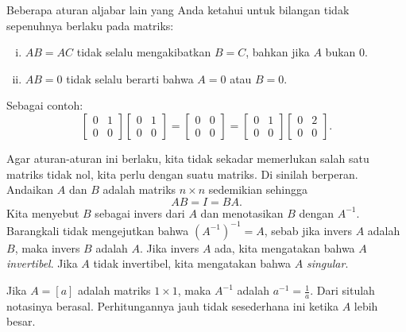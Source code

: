 Beberapa aturan aljabar lain yang Anda ketahui untuk bilangan tidak sepenuhnya
berlaku pada matriks:
\begin{enumerate}[(i)]
\item $AB = AC$ tidak selalu mengakibatkan $B=C$, bahkan jika $A$ bukan 0.
\item $AB = 0$ tidak selalu berarti bahwa $A=0$ atau $B=0$.
\end{enumerate}
Sebagai contoh:
\begin{equation*}
\begin{bmatrix} 0 & 1 \\ 0 & 0 \end{bmatrix}
\begin{bmatrix} 0 & 1 \\ 0 & 0 \end{bmatrix}
=
\begin{bmatrix} 0 & 0 \\ 0 & 0 \end{bmatrix}
=
\begin{bmatrix} 0 & 1 \\ 0 & 0 \end{bmatrix}
\begin{bmatrix} 0 & 2 \\ 0 & 0 \end{bmatrix} .
\end{equation*}

Agar aturan-aturan ini berlaku, kita tidak sekadar memerlukan salah satu matriks tidak nol,
kita perlu  dengan
suatu matriks. Di sinilah \emph{} berperan.
Andaikan $A$ dan $B$ adalah matriks $n \times n$ sedemikian sehingga
\begin{equation*}
AB = I = BA .
\end{equation*}
Kita menyebut $B$ sebagai invers dari $A$ dan menotasikan $B$ dengan $A^{-1}$.
Barangkali tidak mengejutkan bahwa ${(A^{-1})}^{-1} = A$, sebab jika invers $A$
adalah $B$, maka invers $B$ adalah $A$.
Jika invers $A$ ada, kita mengatakan bahwa $A$
\emph{invertibel}.
Jika $A$ tidak invertibel, kita mengatakan bahwa $A$
\emph{singular}.

Jika $A = [a]$ adalah matriks $1 \times 1$, maka $A^{-1}$ adalah $a^{-1} =
\frac{1}{a}$. Dari situlah notasinya berasal. Perhitungannya jauh tidak sesederhana ini ketika $A$
lebih besar.

